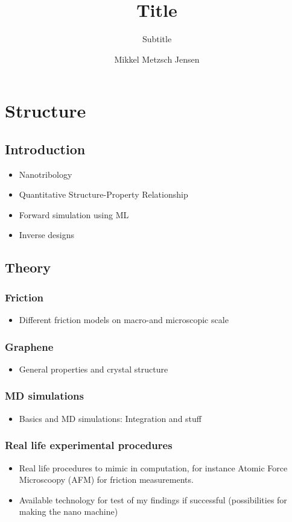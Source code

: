 \documentclass[UKenglish]{book}
\title{Title}
\subtitle{Subtitle}
\author{Mikkel Metzsch Jensen}
\begin{document}
\duoforside[dept={Department of Physics},
  program={Master's Program Name},
  long]                                         

\frontmatter{}


\tableofcontents{}

\mainmatter{}
\section*{Structure}   
\subsection*{Introduction}
\begin{itemize}
  \item Nanotribology
  \item Quantitative Structure-Property Relationship
  \item Forward simulation using ML
  \item Inverse designs
\end{itemize}
\subsection*{Theory}
\subsubsection*{Friction}
\begin{itemize}
  \item Different friction models on macro-and microscopic scale
\end{itemize}
\subsubsection*{Graphene}
\begin{itemize}
  \item General properties and crystal structure
\end{itemize}
\subsubsection*{MD simulations}
\begin{itemize}
  \item Basics and MD simulations: Integration and stuff
\end{itemize}
\subsubsection*{Real life experimental procedures}
\begin{itemize}
  \item Real life procedures to mimic in computation, for instance Atomic Force Microscoopy (AFM) for friction measurements.
  \item Available technology for test of my findings if successful (possibilities for making the nano machine) 
\end{itemize}
\end{document}
